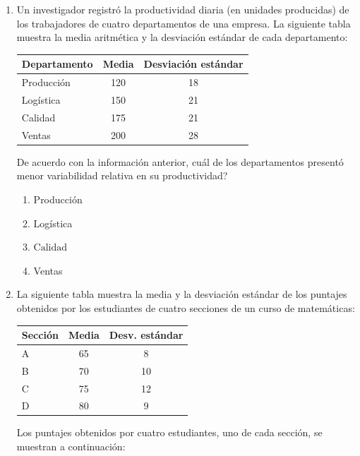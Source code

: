 \documentclass[11pt]{article}
\newcommand{\opcion}[2]{\item $#2$}
\begin{document}
\begin{enumerate}[label=\textbf{\arabic*.}, itemsep=2.5cm]
\Needspace{0.50\textheight}
\item
Un investigador registr\'o la productividad diaria (en unidades producidas) de los trabajadores de cuatro departamentos de una empresa. La siguiente tabla muestra la media aritm\'etica y la desviaci\'on est\'andar de cada departamento:

\begin{center}
\renewcommand{\arraystretch}{1.2}
\begin{tabular}{|l|c|c|}
\hline
\textbf{Departamento} & \textbf{Media} & \textbf{Desviaci\'on est\'andar} \\
\hline
Producci\'on & 120 & 18 \\
Log\'istica  & 150 & 21 \\
Calidad      & 175 & 21 \\
Ventas       & 200 & 28 \\
\hline
\end{tabular}
\end{center}

De acuerdo con la informaci\'on anterior, \textquestiondown cu\'al de los departamentos present\'o menor variabilidad relativa en su productividad?

\begin{enumerate}[label=\Alph*)]
  \item Producci\'on
  \item Log\'istica
  \opcion{C}{\text{Calidad}}
  \item Ventas
\end{enumerate}

\Needspace{0.58\textheight}
\item
La siguiente tabla muestra la media y la desviaci\'on est\'andar de los puntajes obtenidos por los estudiantes de cuatro secciones de un curso de matem\'aticas:

\begin{center}
\renewcommand{\arraystretch}{1.2}
\begin{tabular}{|l|c|c|}
\hline
\textbf{Secci\'on} & \textbf{Media} & \textbf{Desv. est\'andar} \\
\hline
A & 65 &  8 \\
B & 70 & 10 \\
C & 75 & 12 \\
D & 80 &  9 \\
\hline
\end{tabular}
\end{center}

Los puntajes obtenidos por cuatro estudiantes, uno de cada secci\'on, se muestran a continuaci\'on:


\end{enumerate}
\end{document}
